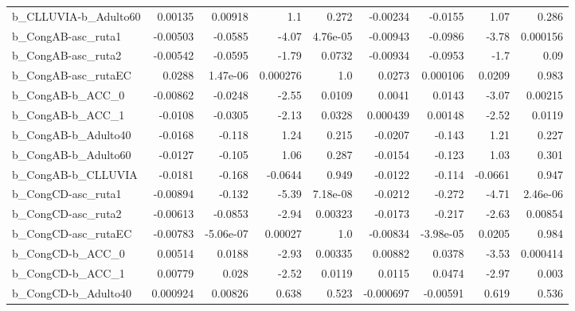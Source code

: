 \begin{tabular}{lrrrrrrrr}
b\_CLLUVIA-b\_Adulto60       &     0.00135 &      0.00918 &       1.1 &    0.272 &   -0.00234 &     -0.0155 &         1.07 &         0.286 \\
b\_CongAB-asc\_ruta1         &    -0.00503 &      -0.0585 &     -4.07 & 4.76e-05 &   -0.00943 &     -0.0986 &        -3.78 &      0.000156 \\
b\_CongAB-asc\_ruta2         &    -0.00542 &      -0.0595 &     -1.79 &   0.0732 &   -0.00934 &     -0.0953 &         -1.7 &          0.09 \\
b\_CongAB-asc\_rutaEC        &      0.0288 &     1.47e-06 &  0.000276 &      1.0 &     0.0273 &    0.000106 &       0.0209 &         0.983 \\
b\_CongAB-b\_ACC\_0           &    -0.00862 &      -0.0248 &     -2.55 &   0.0109 &     0.0041 &      0.0143 &        -3.07 &       0.00215 \\
b\_CongAB-b\_ACC\_1           &     -0.0108 &      -0.0305 &     -2.13 &   0.0328 &   0.000439 &     0.00148 &        -2.52 &        0.0119 \\
b\_CongAB-b\_Adulto40        &     -0.0168 &       -0.118 &      1.24 &    0.215 &    -0.0207 &      -0.143 &         1.21 &         0.227 \\
b\_CongAB-b\_Adulto60        &     -0.0127 &       -0.105 &      1.06 &    0.287 &    -0.0154 &      -0.123 &         1.03 &         0.301 \\
b\_CongAB-b\_CLLUVIA         &     -0.0181 &       -0.168 &   -0.0644 &    0.949 &    -0.0122 &      -0.114 &      -0.0661 &         0.947 \\
b\_CongCD-asc\_ruta1         &    -0.00894 &       -0.132 &     -5.39 & 7.18e-08 &    -0.0212 &      -0.272 &        -4.71 &      2.46e-06 \\
b\_CongCD-asc\_ruta2         &    -0.00613 &      -0.0853 &     -2.94 &  0.00323 &    -0.0173 &      -0.217 &        -2.63 &       0.00854 \\
b\_CongCD-asc\_rutaEC        &    -0.00783 &    -5.06e-07 &   0.00027 &      1.0 &   -0.00834 &   -3.98e-05 &       0.0205 &         0.984 \\
b\_CongCD-b\_ACC\_0           &     0.00514 &       0.0188 &     -2.93 &  0.00335 &    0.00882 &      0.0378 &        -3.53 &      0.000414 \\
b\_CongCD-b\_ACC\_1           &     0.00779 &        0.028 &     -2.52 &   0.0119 &     0.0115 &      0.0474 &        -2.97 &         0.003 \\
b\_CongCD-b\_Adulto40        &    0.000924 &      0.00826 &     0.638 &    0.523 &  -0.000697 &    -0.00591 &        0.619 &         0.536 \\

\end{tabular}
